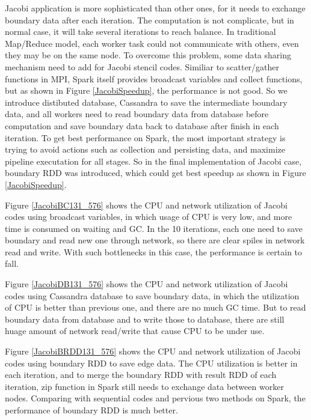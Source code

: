 Jacobi application is more sophisticated than other ones, for it needs to exchange boundary data after each iteration. The computation is not complicate, but in normal case, it will take several iterations to reach balance. In traditional Map/Reduce model, each worker task could not communicate with others, even they may be on the same node. To overcome this problem, some data sharing mechanism need to add for Jacobi stencil codes. Similiar to scatter/gather functions in MPI, Spark itself provides broadcast variables and collect functions, but as shown in Figure \ref{JacobiSpeedup}, the performance is not good. So we introduce distibuted database, Cassandra to save the intermediate boundary data, and all workers need to read boundary data from database before computation and save boundary data back to database after finish in each iteration. To get best performance on Spark, the most important strategy is trying to avoid actions such as collection and persisting data, and maximize pipeline executation for all stages. So in the final implementation of Jacobi case, boundary RDD was introduced, which could get best speedup as shown in Figure \ref{JacobiSpeedup}.

Figure \ref{JacobiBC131_576} shows the CPU and network utilization of Jacobi codes using broadcast variables, in which usage of CPU is very low, and more time is consumed on waiting and GC. In the 10 iterations, each one need to save boundary and read new one through network, so there are clear spiles in network read and write. With such bottlenecks in this case, the performance is certain to fall. 

Figure \ref{JacobiDB131_576} shows the CPU and network utilization of Jacobi codes using Cassandra database to save boundary data, in which the utilization of CPU is better than previous one, and there are no much GC time. But to read boundary data from database and to write those to database, there are still huage amount of network read/write that cause CPU to be under use.

Figure \ref{JacobiBRDD131_576} shows the CPU and network utilization of Jacobi codes using boundary RDD to save edge data. The CPU utilization is better in each iteration, and to merge the boundary RDD with result RDD of each iteration, zip function in Spark still needs to exchange data between worker nodes. Comparing with sequential codes and pervious two methods on Spark, the performance of boundary RDD is much better. 


